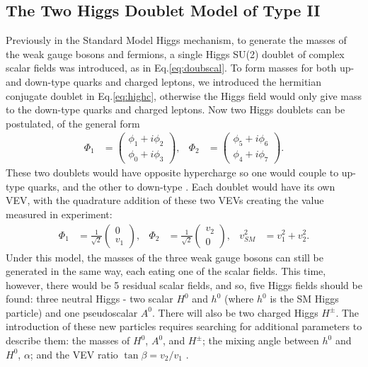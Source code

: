 \documentclass[a4paper,12pt]{article}
\begin{document}
\subsection{The Two Higgs Doublet Model of Type II}
\label{subsec:2hdm}
Previously in the Standard Model Higgs mechanism, to generate the masses of the weak gauge bosons and fermions, a single Higgs SU(2) doublet of complex scalar fields was introduced, as in Eq.\eqref{eq:doubscal}.
To form masses for both up- and down-type quarks and charged leptons, we introduced the hermitian conjugate doublet in Eq.\eqref{eq:highc}, otherwise the Higgs field would only give mass to the down-type quarks and charged leptons. 
Now two Higgs doublets can be postulated, of the general form
\begin{align}
    \label{eq:gdbl}
    \Phi_1 &= \begin{pmatrix} \phi_1 + i\phi_2 \\ \phi_0 + i\phi_3\end{pmatrix}, & \Phi_2 &= \begin{pmatrix} \phi_5+i\phi_6\\\phi_4+i\phi_7\end{pmatrix}.
\end{align}
These two doublets would have opposite hypercharge so one would couple to up-type quarks, and the other to down-type \cite{branco}. 
Each doublet would have its own VEV, with the quadrature addition of these two VEVs creating the value measured in experiment:
\begin{align}
    \label{eq:dbldbl}
    \Phi_1 &= \frac{1}{\sqrt{2}}\begin{pmatrix}0\\v_1\end{pmatrix}, & \Phi_2 &= \frac{1}{\sqrt{2}}\begin{pmatrix}v_2\\0\end{pmatrix}, & v_{SM}^2 &= v_1^2 + v_2^2.
\end{align}
Under this model, the masses of the three weak gauge bosons can still be generated in the same way, each eating one of the scalar fields. 
This time, however, there would be 5 residual scalar fields, and so, five Higgs fields should be found: three neutral Higgs - two scalar $H^0$ and $h^0$ (where $h^0$ is the SM Higgs particle) and one pseudoscalar $A^0$.
There will also be two charged Higgs $H^\pm$.
The introduction of these new particles requires searching for additional parameters to describe them: the masses of $H^0$, $A^0$, and $H^\pm$; the mixing angle between $h^0$ and $H^0$, $\alpha$; and the VEV ratio $\tan\beta=v_2/v_1$ \cite{desc}.
\end{document}
